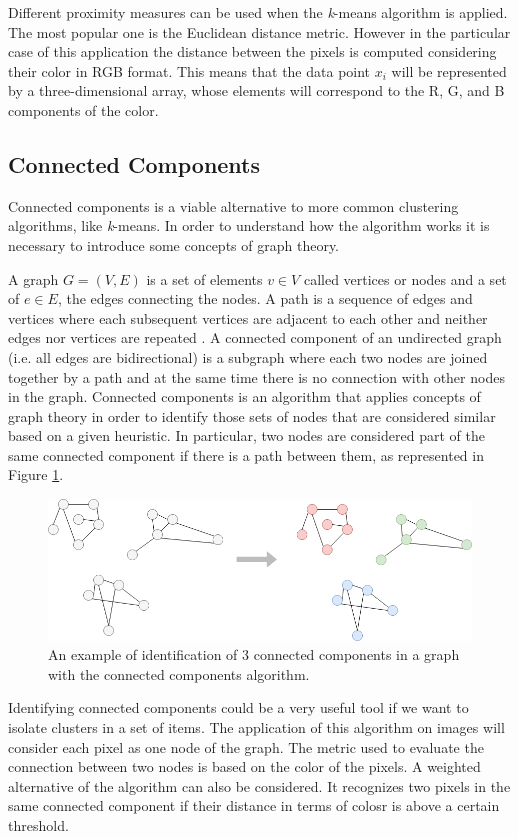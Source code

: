 \documentclass{usiinftr}
\begin{document}
Different proximity measures can be used when the \textit{k}-means algorithm is applied. The most popular one is the Euclidean distance metric. 
However in the particular case of this application the distance between the pixels is computed considering their color in RGB format. This means that the data point $x_i$ will be represented by a three-dimensional array, whose elements will correspond to the R, G, and B components of the color. 

\subsection{Connected Components}
Connected components is a viable alternative to more common clustering algorithms, like \textit{k}-means. In order to understand how the algorithm works it is necessary to introduce some concepts of graph theory.

A graph $G=(V,E)$ is a set of elements $v \in V$ called vertices or nodes and a set of $e \in E$, the edges connecting the nodes. A path is a sequence of edges and vertices where each subsequent vertices are adjacent to each other and neither edges nor vertices are repeated \cite{12}. 
A connected component of an undirected graph (i.e. all edges are bidirectional)  is a subgraph where each two nodes are joined together by a path and at the same time  there is no connection with other nodes in the graph. 
Connected components is an algorithm that applies concepts of graph theory in order to identify those sets of nodes that are considered similar based on a given heuristic. In particular, two nodes are considered part of the same connected component if there is a path between them, as represented in Figure \ref{fig:2}.

\begin{figure}[h]
	\centering
	\includegraphics[width=0.6\linewidth]{img/conn_comp}
	\caption{An example of identification of 3 connected components in a graph with the connected components algorithm.}
	\label{fig:2}
\end{figure}

Identifying connected components could be a very useful tool if we want to isolate clusters in a set of items. 
The application of this algorithm on images will consider each pixel as one node of the graph. The metric used to evaluate the connection between two nodes is based on the color of the pixels. A weighted alternative of the algorithm can also be considered. It recognizes two pixels in the same connected component if their distance in terms of colosr is above a certain threshold.
\end{document}
